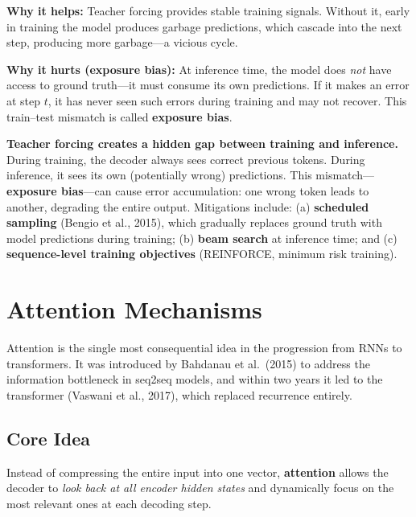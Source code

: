 \textbf{Why it helps:} Teacher forcing provides stable training signals.
Without it, early in training the model produces garbage predictions, which
cascade into the next step, producing more garbage---a vicious cycle.

\textbf{Why it hurts (exposure bias):} At inference time, the model does
\emph{not} have access to ground truth---it must consume its own
predictions.  If it makes an error at step $t$, it has never seen such
errors during training and may not recover.  This train--test mismatch is
called \textbf{exposure bias}.

\begin{warningbox}
\textbf{Teacher forcing creates a hidden gap between training and
inference.}  During training, the decoder always sees correct previous
tokens.  During inference, it sees its own (potentially wrong) predictions.
This mismatch---\textbf{exposure bias}---can cause error accumulation:
one wrong token leads to another, degrading the entire output.  Mitigations
include: (a) \textbf{scheduled sampling} (Bengio et al., 2015), which
gradually replaces ground truth with model predictions during training;
(b) \textbf{beam search} at inference time; and (c) \textbf{sequence-level
training objectives} (REINFORCE, minimum risk training).
\end{warningbox}


\section{Attention Mechanisms}
\label{sec:attention}

Attention is the single most consequential idea in the progression from
RNNs to transformers.  It was introduced by Bahdanau et al.\ (2015) to
address the information bottleneck in seq2seq models, and within two years
it led to the transformer (Vaswani et al., 2017), which replaced recurrence
entirely.

\subsection{Core Idea}

Instead of compressing the entire input into one vector, \textbf{attention}
allows the decoder to \emph{look back at all encoder hidden states} and
dynamically focus on the most relevant ones at each decoding step.


